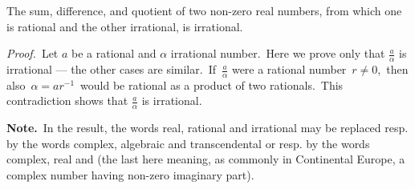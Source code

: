 \documentclass[12pt]{article}
\begin{document}
The sum, difference,  and quotient of two non-zero real numbers, from which one is rational and the other irrational, is irrational.

{\em Proof.} \,Let $a$ be a rational and $\alpha$ irrational number. \,Here we prove only that $\frac{a}{\alpha}$ is irrational --- the other cases are similar. \,If \,$\frac{a}{\alpha}$ were a rational number \,$r \neq 0$, \,then also \,$\alpha = ar^{-1}$\, would be rational as a product of two rationals. \,This contradiction shows that $\frac{a}{\alpha}$ is irrational.

\textbf{Note.} \,In the result, the words real, rational and irrational may be replaced resp. by the words complex, algebraic and transcendental or resp. by the words complex, real and  (the last  here meaning, as commonly in Continental Europe, a complex number having non-zero imaginary part).
\end{document}
